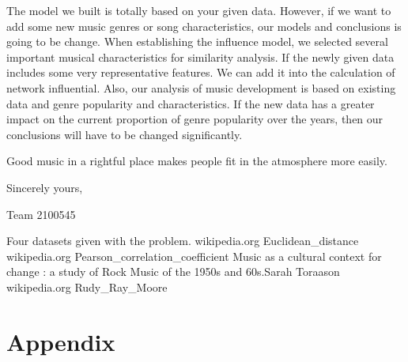 \documentclass[12pt]{article}
\begin{document}
The model we built is totally based on your given data. However, if we want to add some new music genres or song characteristics, our models and conclusions is going to be change. When establishing the influence model, we selected several important musical characteristics for similarity analysis. If the newly given data includes some very representative features. We can add it into the calculation of network influential. Also, our analysis of music development is based on existing data and genre popularity and characteristics. If the new data has a greater impact on the current proportion of genre popularity over the years, then our conclusions will have to be changed significantly. \par
Good music in a rightful place makes people fit in the atmosphere more easily.
\begin{flushright}
Sincerely yours,

Team 2100545
\end{flushright}
\begin{thebibliography}{99}
Four datasets given with the problem.
wikipedia.org Euclidean\_distance
wikipedia.org Pearson\_correlation\_coefficient
Music as a cultural context for change : a study of Rock Music of the 1950s and 60s.Sarah Toraason
wikipedia.org Rudy\_Ray\_Moore
\end{thebibliography}
\section*{Appendix}
\end{document}
